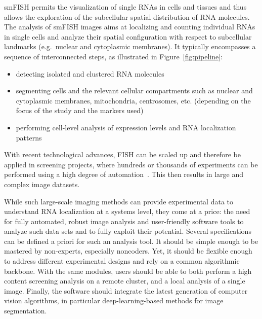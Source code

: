 \ac{smFISH} permits the visualization of single \ac{RNA}s in cells and tissues and thus allows the exploration of the subcellular spatial distribution of \ac{RNA} molecules.
The analysis of \ac{smFISH} images aims at localizing and counting individual \ac{RNA}s in single cells and analyze their spatial configuration with respect to subcellular landmarks (e.g.~nuclear and cytoplasmic membranes).
It typically encompasses a sequence of interconnected steps, as illustrated in Figure~\ref{fig:pipeline}:
\begin{itemize}
	\setlength\itemsep{0.1em}
	\item detecting isolated and clustered \ac{RNA} molecules
	\item segmenting cells and the relevant cellular compartments such as nuclear and cytoplasmic membranes, mitochondria, centrosomes, etc. (depending on the focus of the study and the markers used)
	\item performing cell-level analysis of expression levels and \ac{RNA} localization patterns
\end{itemize}

With recent technological advances, \ac{FISH} can be scaled up and therefore be applied in screening projects, where hundreds or thousands of experiments can be performed using a high degree of automation~\cite{safieddine_ht_smfish_2022}.
This then results in large and complex image datasets.

While such large-scale imaging methods can provide experimental data to understand \ac{RNA} localization at a systems level, they come at a price: the need for fully automated, robust image analysis and user-friendly software tools to analyze such data sets and to fully exploit their potential.
Several specifications can be defined a priori for such an analysis tool.
It should be simple enough to be mastered by non-experts, especially noncoders.
Yet, it should be flexible enough to address different experimental designs and rely on a common algorithmic backbone.
With the same modules, users should be able to both perform a high content screening analysis on a remote cluster, and a local analysis of a single image.
Finally, the software should integrate the latest generation of computer vision algorithms, in particular deep-learning-based methods for image segmentation.

